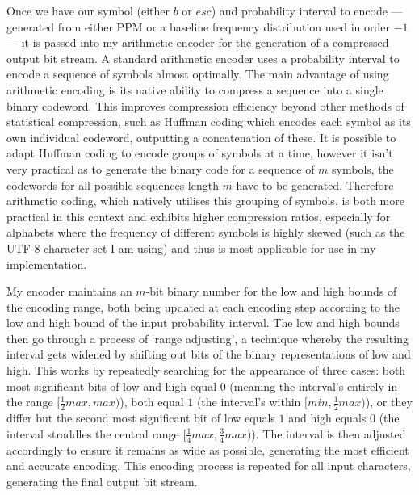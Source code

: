 \documentclass[a4paper, 11pt]{article}
\begin{document}
Once we have our symbol (either $b$ or $esc$) and probability interval to encode --- generated from either PPM or a baseline frequency distribution used in order $-1$ --- it is passed into my arithmetic encoder for the generation of a compressed output bit stream. A standard arithmetic encoder uses a probability interval to encode a sequence of symbols almost optimally. The main advantage of using arithmetic encoding is its native ability to compress a sequence into a single binary codeword. This improves compression efficiency beyond other methods of statistical compression, such as Huffman coding which encodes each symbol as its own individual codeword, outputting a concatenation of these. It is possible to adapt Huffman coding to encode groups of symbols at a time, however it isn't very practical as to generate the binary code for a sequence of $m$ symbols, the codewords for all possible sequences length $m$ have to be generated. Therefore arithmetic coding, which natively utilises this grouping of symbols, is both more practical in this context and exhibits higher compression ratios, especially for alphabets where the frequency of different symbols is highly skewed (such as the UTF-8 character set I am using) and thus is most applicable for use in my implementation.

My encoder maintains an $m$-bit binary number for the low and high bounds of the encoding range, both being updated at each encoding step according to the low and high bound of the input probability interval. The low and high bounds then go through a process of `range adjusting', a technique whereby the resulting interval gets widened by shifting out bits of the binary representations of low and high. This works by repeatedly searching for the appearance of three cases: both most significant bits of low and high equal $0$ (meaning the interval's entirely in the range $[\frac{1}{2}max, max)$), both equal $1$ (the interval’s within $[min, \frac{1}{2}max)$), or they differ but the second most significant bit of low equals $1$ and high equals $0$ (the interval straddles the central range $[\frac{1}{4}max, \frac{3}{4}max)$). The interval is then adjusted accordingly to ensure it remains as wide as possible, generating the most efficient and accurate encoding. This encoding process is repeated for all input characters, generating the final output bit stream.
\end{document}
